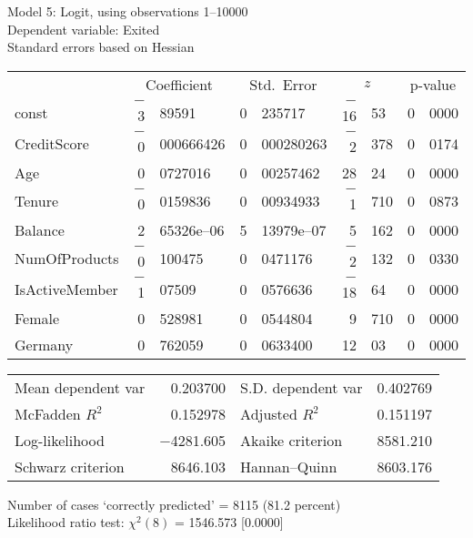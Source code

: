\documentclass[11pt]{article}
\begin{document}
\thispagestyle{empty}

\begin{center}

Model 5: Logit, using observations 1--10000\\
Dependent variable: Exited\\
Standard errors based on Hessian

\vspace{1em}

\begin{tabular}{lr@{.}lr@{.}lr@{.}lr@{.}l}
  &
 \multicolumn{2}{c}{Coefficient} &
  \multicolumn{2}{c}{Std.\ Error} &
   \multicolumn{2}{c}{$z$} &
    \multicolumn{2}{c}{p-value} \\[1ex]
const &
  $-$3&89591 &
    0&235717 &
      $-$16&53 &
        0&0000 \\
CreditScore &
  $-$0&000666426 &
    0&000280263 &
      $-$2&378 &
        0&0174 \\
Age &
  0&0727016 &
    0&00257462 &
      28&24 &
        0&0000 \\
Tenure &
  $-$0&0159836 &
    0&00934933 &
      $-$1&710 &
        0&0873 \\
Balance &
  2&65326\textrm{e--06} &
    5&13979\textrm{e--07} &
      5&162 &
        0&0000 \\
NumOfProducts &
  $-$0&100475 &
    0&0471176 &
      $-$2&132 &
        0&0330 \\
IsActiveMember &
  $-$1&07509 &
    0&0576636 &
      $-$18&64 &
        0&0000 \\
Female &
  0&528981 &
    0&0544804 &
      9&710 &
        0&0000 \\
Germany &
  0&762059 &
    0&0633400 &
      12&03 &
        0&0000 \\
\end{tabular}

\vspace{1ex}
\begin{tabular}{lrlr}
Mean dependent var &  0.203700 & S.D. dependent var &  0.402769 \\
McFadden $R^2$ &  0.152978 & Adjusted $R^2$ &  0.151197 \\
Log-likelihood & $-$4281.605 & Akaike criterion &  8581.210 \\
Schwarz criterion &  8646.103 & Hannan--Quinn &  8603.176 \\
\end{tabular}


\vspace{1ex}
\vspace{1em}
\begin{raggedright}
Number of cases `correctly predicted' = 8115 (81.2 percent)\\
Likelihood ratio test: $\chi^2(8)$ = 1546.573 [0.0000]\\
\end{raggedright}

\end{center}
\end{document}
